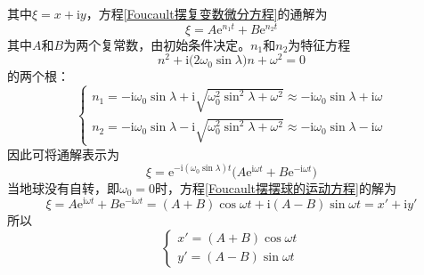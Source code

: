 其中$\xi = x + \mathrm{i}y$，方程\eqref{Foucault摆复变数微分方程}的通解为
\begin{equation*}
	\xi = A\mathrm{e}^{n_1 t} + B\mathrm{e}^{n_2 t}
\end{equation*}
其中$A$和$B$为两个复常数，由初始条件决定。$n_1$和$n_2$为特征方程
\begin{equation*}
	n^2 + \mathrm{i} \big(2\omega_0 \sin \lambda \big) n + \omega^2 = 0
\end{equation*}
的两个根：
\begin{equation*}
\begin{cases}
	n_1 = -\mathrm{i} \omega_0 \sin \lambda + \mathrm{i} \sqrt{\omega_0^2 \sin^2 \lambda + \omega^2} \approx -\mathrm{i} \omega_0 \sin \lambda + \mathrm{i} \omega \\
	n_2 = -\mathrm{i} \omega_0 \sin \lambda - \mathrm{i} \sqrt{\omega_0^2 \sin^2 \lambda + \omega^2} \approx -\mathrm{i} \omega_0 \sin \lambda - \mathrm{i} \omega
\end{cases}
\end{equation*}
因此可将通解表示为
\begin{equation}
	\xi = \mathrm{e}^{-\mathrm{i}(\omega_0\sin \lambda) t} \big(A \mathrm{e}^{\mathrm{i} \omega t} + B \mathrm{e}^{-\mathrm{i} \omega t}\big)
	\label{Foucault摆通解}
\end{equation}
当地球没有自转，即$\omega_0 = 0$时，方程\eqref{Foucault摆摆球的运动方程}的解为
\begin{equation*}
	\xi = A \mathrm{e}^{\mathrm{i} \omega t} + B \mathrm{e}^{-\mathrm{i} \omega t} = (A+B) \cos \omega t + \mathrm{i}(A-B) \sin \omega t = x'+\mathrm{i} y'
\end{equation*}
所以
\begin{equation}
\begin{cases}
	x' = (A+B)\cos \omega t \\
	y' = (A-B)\sin \omega t
\end{cases}
\end{equation}

